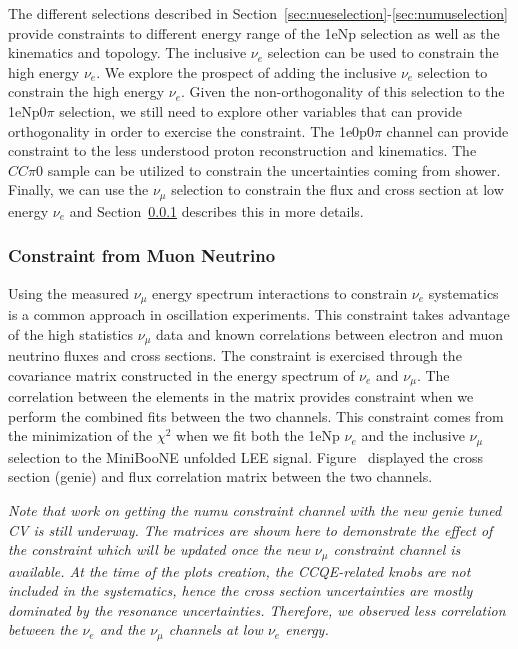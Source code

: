 \documentclass[a4paper]{article}
\begin{document}
The different selections described in Section~\ref{sec:nueselection}-\ref{sec:numuselection} provide constraints to different energy range of the 1eNp selection as well as the kinematics and topology. The inclusive $\nu_e$ selection can be used to constrain the high energy $\nu_e$. We explore the prospect of adding the inclusive $\nu_e$ selection to constrain the high energy $\nu_e$. Given the non-orthogonality of this selection to the 1eNp0$\pi$ selection, we still need to explore other variables that can provide orthogonality in order to exercise the constraint. The 1e0p0$\pi$ channel can provide constraint to the less understood proton reconstruction and kinematics. The $CC\pi0$ sample can be utilized to constrain the uncertainties coming from shower. Finally, we can use the $\nu_\mu$ selection to constrain the flux and cross section at low energy $\nu_e$ and Section~\ref{subsec:constraintfromnumu} describes this in more details.

\subsubsection{Constraint from Muon Neutrino}
\label{subsec:constraintfromnumu}
Using the measured $\nu_{\mu}$ energy spectrum interactions to constrain $\nu_e$ systematics is a common approach in oscillation experiments. 
This constraint takes advantage of the high statistics $\nu_{\mu}$ data and known correlations between electron and muon neutrino fluxes and cross sections. 
The constraint is exercised through the covariance matrix constructed in the energy spectrum of $\nu_e$ and $\nu_{\mu}$. 
The correlation between the elements in the matrix provides constraint when we perform the combined fits between the two channels. 
This constraint comes from the minimization of the $\chi^2$ when we fit both the 1eNp $\nu_e$ and the inclusive $\nu_{\mu}$ selection to the MiniBooNE unfolded LEE signal. 
Figure~\cite{fig:numuconstraint} displayed the cross section (genie) and flux correlation matrix between the two channels. 

\textit{Note that work on getting the numu constraint channel with the new genie tuned CV is still underway. 
The matrices are shown here to demonstrate the effect of the constraint which will be updated once the new $\nu_{\mu}$ constraint channel is available. 
At the time of the plots creation, the CCQE-related knobs are not included in the systematics, hence the cross section uncertainties are mostly dominated by the resonance uncertainties. 
Therefore, we observed less correlation between the $\nu_e$ and the $\nu_{\mu}$ channels at low $\nu_e$ energy.}
\end{document}
